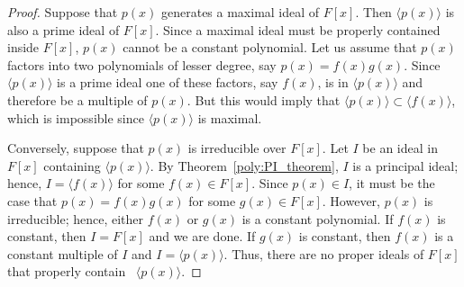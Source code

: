  
\begin{proof}
Suppose that $p(x)$ generates a maximal ideal of $F[x]$. Then $\langle
p(x) \rangle$ is also a prime ideal of $F[x]$. Since a maximal ideal
must be properly contained inside $F[x]$, $p(x)$ cannot be a constant
polynomial. Let us assume that $p(x)$ factors into two polynomials of
lesser degree, say $p(x) = f(x) g(x)$. Since $\langle p(x) \rangle$ is
a prime ideal one of these factors, say $f(x)$, is in $\langle p(x)
\rangle$ and therefore be a multiple of $p(x)$. But this would imply
that $\langle p(x) \rangle \subset \langle f(x) \rangle$, which is 
impossible since $\langle p(x) \rangle$ is maximal.
 
 
Conversely, suppose that $p(x)$ is irreducible over $F[x]$. Let $I$ be
an ideal in $F[x]$ containing $\langle p(x) \rangle$. By Theorem~\ref{poly:PI_theorem},
$I$ is a principal ideal; hence, $I = \langle f(x) \rangle$ for some
$f(x) \in F[x]$. Since $p(x) \in I$, it must be the case that $p(x) =
f(x) g(x)$ for some $g(x) \in F[x]$. However, $p(x)$ is irreducible;
hence, either $f(x)$ or $g(x)$ is a constant polynomial. If $f(x)$ is
constant, then $I = F[x]$ and we are done.  If $g(x)$ is constant, then
$f(x)$ is a constant multiple of $I$ and $I = \langle p(x) \rangle$.
Thus, there are no proper ideals of $F[x]$ that properly contain~
\mbox{$\langle p(x)\rangle$}. 
\end{proof}

\histhead

